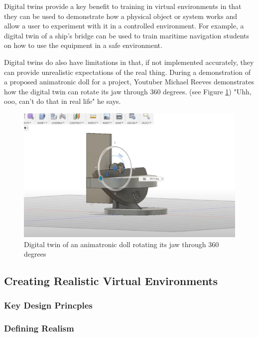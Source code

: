 \documentclass[12pt]{article}
\begin{document}
Digital twins provide a key benefit to training in virtual environments in that they can be used to demonstrate how a physical object or system works and allow a user to experiment with it in a controlled environment. For example, a digital twin of a ship's bridge can be used to train maritime navigation students on how to use the equipment in a safe environment. 

Digital twins do also have limitations in that, if not implemented accurately, they can provide unrealistic expectations of the real thing. During a demonstration of a proposed animatronic doll for a project, Youtuber Michael Reeves demonstrates how the digital twin can rotate its jaw through 360 degrees. (see Figure \ref{fig:michaelreeves}) "Uhh, ooo, can't do that in real life" he says. \cite{reevesYouTube}

\begin{figure}[h]
  \centering
  \begin{minipage}[b]{0.9\linewidth}
    \includegraphics[width=\linewidth]{images/michael reeves.png}
    \caption{Digital twin of an animatronic doll rotating its jaw through 360 degrees}
    \label{fig:michaelreeves}
  \end{minipage}
\end{figure}

\subsection{Creating Realistic Virtual Environments}

\subsubsection{Key Design Princples}

\subsubsection{Defining Realism}
\end{document}
